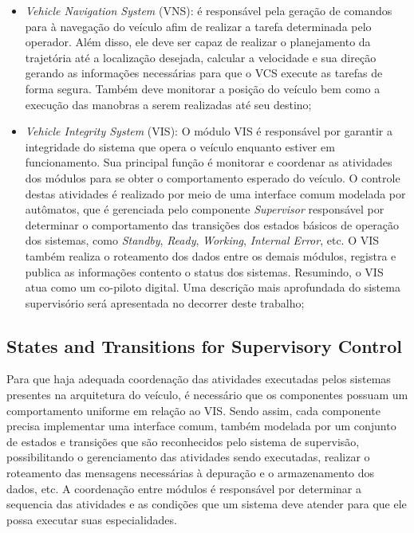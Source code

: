 \documentclass[conference]{IEEEtran}
\begin{document}
\begin{itemize}
	\item \textit{Vehicle Navigation System} (VNS): é responsável pela geração de comandos para à navegação do veículo afim de realizar a tarefa determinada pelo operador. Além disso, ele deve ser capaz de realizar o planejamento da trajetória até a localização desejada, calcular a velocidade e sua direção gerando as informações necessárias para que o VCS execute as tarefas de forma segura. Também deve	monitorar a posição do veículo bem como a execução das manobras a serem realizadas até seu destino;
	
	\item \textit{Vehicle Integrity System} (VIS): O módulo VIS é responsável por garantir a integridade do sistema que opera o veículo enquanto estiver em funcionamento. Sua principal função é monitorar e coordenar as atividades dos módulos para se obter o comportamento esperado do veículo. O controle destas atividades é realizado por meio de uma interface comum modelada por autômatos, que é gerenciada pelo componente \textit{Supervisor} responsável por determinar o comportamento das transições dos estados básicos de operação dos sistemas, como \textit{Standby}, \textit{Ready}, \textit{Working}, \textit{Internal Error}, etc. O VIS também realiza o roteamento dos dados entre os demais módulos, registra e publica as informações contento o status dos sistemas. Resumindo, o VIS atua como um co-piloto digital. Uma descrição mais aprofundada do sistema supervisório será apresentada no decorrer deste trabalho;
\end{itemize}
%
\subsection{States and Transitions for Supervisory Control}\label{subsec:states_transitions}

Para que haja adequada coordenação das atividades executadas pelos sistemas presentes na arquitetura do veículo, é necessário que os componentes possuam um comportamento uniforme em relação ao VIS. Sendo assim, cada componente precisa implementar uma interface comum, também modelada por um conjunto de estados e transições que são reconhecidos pelo sistema de supervisão, possibilitando o gerenciamento das atividades sendo executadas, realizar o roteamento das mensagens necessárias à depuração e o armazenamento dos dados, etc. A coordenação entre módulos é responsável por determinar a sequencia das atividades e as condições que um sistema deve atender para que ele possa executar suas especialidades.
\end{document}
